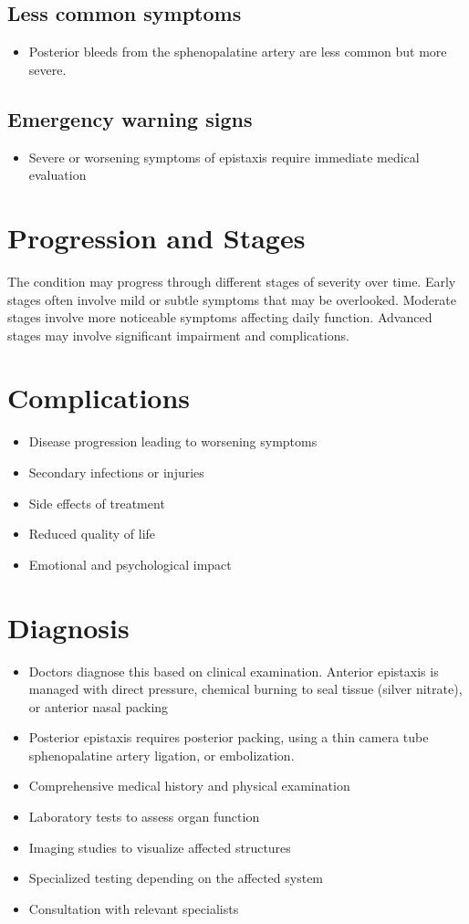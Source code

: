 \subsection{Less common symptoms}
\begin{itemize}[noitemsep]
  \item Posterior bleeds from the sphenopalatine artery are less common but more severe.
\end{itemize}

\subsection{Emergency warning signs}
\begin{itemize}[noitemsep]
  \item Severe or worsening symptoms of epistaxis require immediate medical evaluation
\end{itemize}
\section{Progression and Stages}
The condition may progress through different stages of severity over time. Early stages often involve mild or subtle symptoms that may be overlooked. Moderate stages involve more noticeable symptoms affecting daily function. Advanced stages may involve significant impairment and complications.
\section{Complications}
\begin{itemize}[noitemsep]
  \item Disease progression leading to worsening symptoms
  \item Secondary infections or injuries
  \item Side effects of treatment
  \item Reduced quality of life
  \item Emotional and psychological impact
\end{itemize}
\section{Diagnosis}
\begin{itemize}[noitemsep]
  \item Doctors diagnose this based on clinical examination. Anterior epistaxis is managed with direct pressure, chemical burning to seal tissue (silver nitrate), or anterior nasal packing
  \item Posterior epistaxis requires posterior packing, using a thin camera tube sphenopalatine artery ligation, or embolization.
  \item Comprehensive medical history and physical examination
  \item Laboratory tests to assess organ function
  \item Imaging studies to visualize affected structures
  \item Specialized testing depending on the affected system
  \item Consultation with relevant specialists
\end{itemize}

